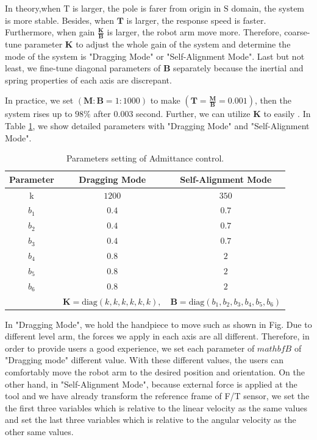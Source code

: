 \par
In theory,when $\mathrm{T}$ is larger, the pole is farer from origin in $\mathrm{S}$ domain, the system is more stable. Besides, when $\mathbf{T}$ is larger, the response speed is faster. Furthermore, when gain $\frac{\mathbf{K}}{\mathbf{B}}$ is larger, the robot arm move more. Therefore, coarse-tune parameter $\mathbf{K}$ to adjust the whole gain of the system and determine the mode of the system is "Dragging Mode" or "Self-Alignment Mode". Last but not least, we fine-tune diagonal parameters of $\mathbf{B}$ separately because the inertial and spring properties of each axis are discrepant. 
\par
In practice, we set $(\mathbf{M} : \mathbf{B} = 1 : 1000)$  to make $(\mathbf{T} = \frac{\mathbf{M}}{\mathbf{B}} = 0.001)$, then the system rises up to $98\%$ after $0.003$ second. Further, we can utilize $\mathbf{K}$ to easily . In Table \ref{tab: para_adm}, we show detailed parameters with "Dragging Mode" and "Self-Alignment Mode".
\begin{table}[htbp]
\centering
\caption{Parameters setting of Admittance control.}
\label{tab: para_adm}
\begin{tabular}{ccc} 
\hline \hline
Parameter	&Dragging Mode		&Self-Alignment Mode	\\
\hline
k			&$1200$				&$350$					\\
$b_1$		&$0.4$				&$0.7$					\\
$b_2$		&$0.4$				&$0.7$					\\
$b_3$		&$0.4$				&$0.7$					\\
$b_4$		&$0.8$				&$2$					\\
$b_5$		&$0.8$				&$2$					\\
$b_6$		&$0.8$				&$2$					\\
\hline	
&$\mathbf{K} = \text{diag}(k,k,k,k,k,k),$ &$\mathbf{B} = \text{diag}(b_1,b_2,b_3,b_4,b_5,b_6)$\\
\hline\hline	
\end{tabular}
\end{table}
\par
In "Dragging Mode", we hold the handpiece to move such as shown in Fig. Due to different level arm, the forces we apply in each axis are all different. Therefore, in order to provide users a good experience, we set each parameter of $mathbf{B}$ of "Dragging mode" different value. With these different values, the users can comfortably move the robot arm to the desired position and orientation. On the other hand, in "Self-Alignment Mode", because external force is applied at the tool and we have already transform the reference frame of F/T sensor, we set the the first three variables which is relative to the linear velocity as the same values and set the last three variables which is relative to the angular velocity as the other same values.